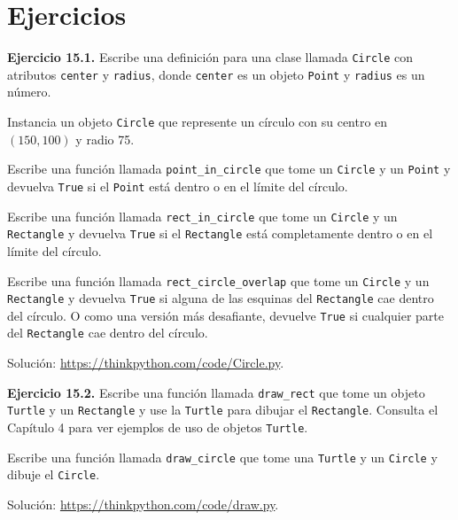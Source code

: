 \section{Ejercicios}

\textbf{Ejercicio 15.1.} Escribe una definición para una clase llamada \texttt{Circle} con atributos \texttt{center} y \texttt{radius}, donde \texttt{center} es un objeto \texttt{Point} y \texttt{radius} es un número.

Instancia un objeto \texttt{Circle} que represente un círculo con su centro en $(150,100)$ y radio 75.

Escribe una función llamada \texttt{point\_in\_circle} que tome un \texttt{Circle} y un \texttt{Point} y devuelva \texttt{True} si el \texttt{Point} está dentro o en el límite del círculo.

Escribe una función llamada \texttt{rect\_in\_circle} que tome un \texttt{Circle} y un \texttt{Rectangle} y devuelva \texttt{True} si el \texttt{Rectangle} está completamente dentro o en el límite del círculo.

Escribe una función llamada \texttt{rect\_circle\_overlap} que tome un \texttt{Circle} y un \texttt{Rectangle} y devuelva \texttt{True} si alguna de las esquinas del \texttt{Rectangle} cae dentro del círculo. O como una versión más desafiante, devuelve \texttt{True} si cualquier parte del \texttt{Rectangle} cae dentro del círculo.

Solución: \url{https://thinkpython.com/code/Circle.py}.

\textbf{Ejercicio 15.2.} Escribe una función llamada \texttt{draw\_rect} que tome un objeto \texttt{Turtle} y un \texttt{Rectangle} y use la \texttt{Turtle} para dibujar el \texttt{Rectangle}. Consulta el Capítulo 4 para ver ejemplos de uso de objetos \texttt{Turtle}.

Escribe una función llamada \texttt{draw\_circle} que tome una \texttt{Turtle} y un \texttt{Circle} y dibuje el \texttt{Circle}.

Solución: \url{https://thinkpython.com/code/draw.py}.